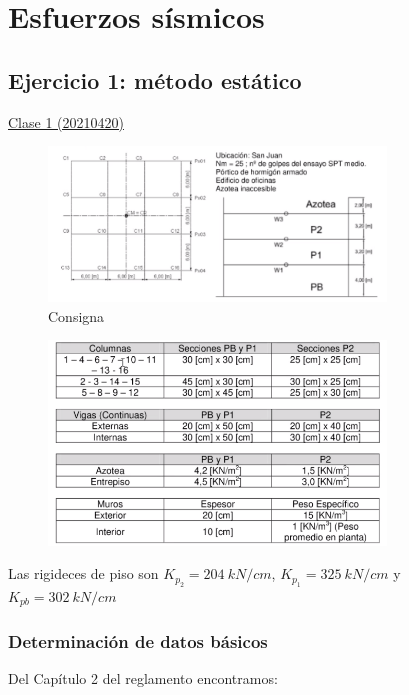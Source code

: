 \documentclass[../main.tex]{subfiles}
\begin{document}
\section{Esfuerzos sísmicos}

\subsection{Ejercicio 1: método estático}

\href{https://youtu.be/6VVqDEFBOIk}{Clase 1 (20210420)}

\begin{figure}[h]
  \centering
  \includegraphics[width=0.8\textwidth]{../images/20210420/ej1}
  \caption{Consigna}
  \label{fig:ej1}
\end{figure}

\begin{figure}[h]
  \centering
  \includegraphics[width=0.8\textwidth]{../images/20210420/ej1_1}
\end{figure}

Las rigideces de piso son $K_{p_2}=\SI{204}{kN / cm}$, $K_{p_1}=\SI{325}{kN /cm}$
 y $K_{pb}=\SI{302}{kN / cm}$

\subsubsection{Determinación de datos básicos}

Del Capítulo 2 del reglamento encontramos:
\end{document}

